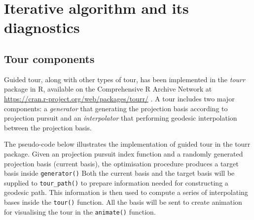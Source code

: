\documentclass[12pt]{article}
\begin{document}
\hypertarget{iterative-algorithm-and-its-diagnostics}{%
\section{Iterative algorithm and its
diagnostics}\label{iterative-algorithm-and-its-diagnostics}}

\hypertarget{tour-components}{%
\subsection{Tour components}\label{tour-components}}

Guided tour, along with other types of tour, has been implemented in the
\emph{tourr} package in R, available on the Comprehensive R Archive
Network at \url{https://cran.r-project.org/web/packages/tourr/}
\citep{wickham2011tourrpackage}. A tour includes two major components: a
\emph{generator} that generating the projection basis according to
projection pursuit and an \emph{interpolator} that performing geodesic
interpolation between the projection basis.

The pseudo-code below illustrates the implementation of guided tour in
the tourr package. Given an projection pursuit index function and a
randomly generated projection basis (current basis), the optimisation
procedure produces a target basis inside \texttt{generator()} Both the
current basis and the target basis will be supplied to
\texttt{tour\_path()} to prepare information needed for constructing a
geodesic path. This information is then used to compute a series of
interpolating bases inside the \texttt{tour()} function. All the basis
will be sent to create animation for visualising the tour in the
\texttt{animate()} function.
\end{document}
